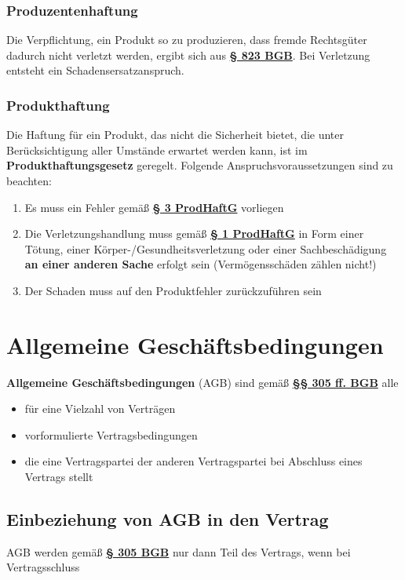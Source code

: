 \documentclass[12pt,A4]{extarticle}
\newcommand{\highlight}[1]{\textcolor{highlightColor}{\textbf{#1}}}
\newcommand{\bgb}[2][]{\textbf{\textcolor{gesetzLink}{\href{https://www.gesetze-im-internet.de/bgb/__#2.html}{§ #2 \ifthenelse{\equal{#1}{}}{}{#1 }BGB}}}}
\newcommand{\bgbb}[2][]{\textbf{\textcolor{gesetzLink}{\href{https://www.gesetze-im-internet.de/bgb/__#2.html}{§§ #1 BGB}}}}
\newcommand{\prodHaftG}[2][]{\textbf{\textcolor{gesetzLink}{\href{https://www.gesetze-im-internet.de/prodhaftg/__#2.html}{§ #2 \ifthenelse{\equal{#1}{}}{}{#1 }ProdHaftG}}}}
\begin{document}
\subsubsection{Produzentenhaftung}
Die Verpflichtung, ein Produkt so zu produzieren, dass fremde Rechtsgüter dadurch nicht verletzt werden, ergibt sich aus \bgb{823}. Bei Verletzung entsteht ein Schadensersatzanspruch.

\subsubsection{Produkthaftung}
Die Haftung für ein Produkt, das nicht die Sicherheit bietet, die unter Berücksichtigung aller Umstände erwartet werden kann, ist im \textbf{Produkthaftungsgesetz} geregelt. Folgende Anspruchsvoraussetzungen sind zu beachten:

\begin{enumerate}
  \item{Es muss ein Fehler gemäß \prodHaftG{3} vorliegen}
  \item{Die Verletzungshandlung muss gemäß \prodHaftG[Abs. 1]{1} in Form einer Tötung, einer Körper-/Gesundheitsverletzung oder einer Sachbeschädigung \textbf{an einer anderen Sache} erfolgt sein (Vermögensschäden zählen nicht!)}
  \item{Der Schaden muss auf den Produktfehler zurückzuführen sein}
\end{enumerate}

\section{Allgemeine Geschäftsbedingungen}
\highlight{Allgemeine Geschäftsbedingungen} (AGB) sind gemäß \bgbb[305 ff.]{305} alle

\begin{itemize}
  \item{für eine Vielzahl von Verträgen}
  \item{vorformulierte Vertragsbedingungen}
  \item{die eine Vertragspartei der anderen Vertragspartei bei Abschluss eines Vertrags stellt}
\end{itemize}

\subsection{Einbeziehung von AGB in den Vertrag}
AGB werden gemäß \bgb[Abs. 2]{305} nur dann Teil des Vertrags, wenn bei Vertragsschluss
\end{document}
